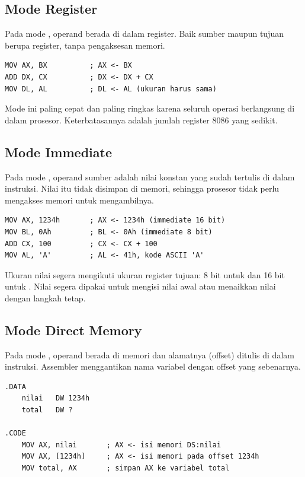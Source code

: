\subsection{Mode Register}

Pada mode , operand berada di dalam register. Baik
sumber maupun tujuan berupa register, tanpa pengaksesan memori.

\begin{lstlisting}[language=MASM, numbers=none]
MOV AX, BX          ; AX <- BX
ADD DX, CX          ; DX <- DX + CX
MOV DL, AL          ; DL <- AL (ukuran harus sama)
\end{lstlisting}

Mode ini paling cepat dan paling ringkas karena seluruh operasi
berlangsung di dalam prosesor. Keterbatasannya adalah jumlah register
8086 yang sedikit.

\subsection{Mode Immediate}

Pada mode , operand sumber adalah nilai konstan yang
sudah tertulis di dalam instruksi. Nilai itu tidak disimpan di
memori, sehingga prosesor tidak perlu mengakses memori untuk
mengambilnya.

\begin{lstlisting}[language=MASM, numbers=none]
MOV AX, 1234h       ; AX <- 1234h (immediate 16 bit)
MOV BL, 0Ah         ; BL <- 0Ah (immediate 8 bit)
ADD CX, 100         ; CX <- CX + 100
MOV AL, 'A'         ; AL <- 41h, kode ASCII 'A'
\end{lstlisting}

Ukuran nilai segera mengikuti ukuran register tujuan: 8 bit untuk
 dan 16 bit untuk . Nilai segera dipakai untuk
mengisi nilai awal atau menaikkan nilai dengan langkah tetap.

\subsection{Mode Direct Memory}

Pada mode , operand berada di memori dan
alamatnya (offset) ditulis di dalam instruksi. Assembler menggantikan
nama variabel dengan offset yang sebenarnya.

\begin{lstlisting}[language=MASM, numbers=none]
.DATA
    nilai   DW 1234h
    total   DW ?

.CODE
    MOV AX, nilai       ; AX <- isi memori DS:nilai
    MOV AX, [1234h]     ; AX <- isi memori pada offset 1234h
    MOV total, AX       ; simpan AX ke variabel total
\end{lstlisting}

